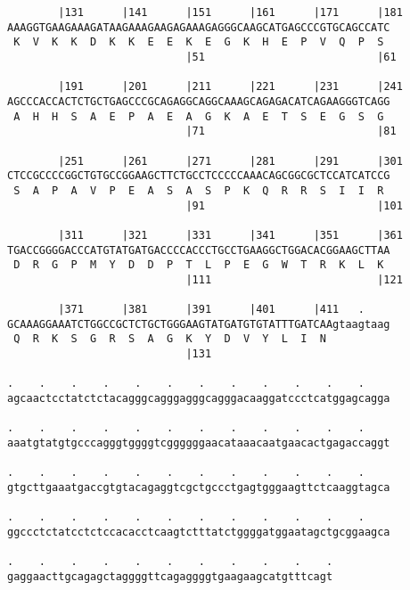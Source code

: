\documentclass{article}
\begin{document}
\begin{Verbatim}
        |131      |141      |151      |161      |171      |181
AAAGGTGAAGAAAGATAAGAAAGAAGAGAAAGAGGGCAAGCATGAGCCCGTGCAGCCATC
 K  V  K  K  D  K  K  E  E  K  E  G  K  H  E  P  V  Q  P  S 
                            |51                           |61
  
        |191      |201      |211      |221      |231      |241
AGCCCACCACTCTGCTGAGCCCGCAGAGGCAGGCAAAGCAGAGACATCAGAAGGGTCAGG
 A  H  H  S  A  E  P  A  E  A  G  K  A  E  T  S  E  G  S  G 
                            |71                           |81
  
        |251      |261      |271      |281      |291      |301
CTCCGCCCCGGCTGTGCCGGAAGCTTCTGCCTCCCCCAAACAGCGGCGCTCCATCATCCG
 S  A  P  A  V  P  E  A  S  A  S  P  K  Q  R  R  S  I  I  R 
                            |91                           |101
  
        |311      |321      |331      |341      |351      |361
TGACCGGGGACCCATGTATGATGACCCCACCCTGCCTGAAGGCTGGACACGGAAGCTTAA
 D  R  G  P  M  Y  D  D  P  T  L  P  E  G  W  T  R  K  L  K 
                            |111                          |121
  
        |371      |381      |391      |401      |411   .    
GCAAAGGAAATCTGGCCGCTCTGCTGGGAAGTATGATGTGTATTTGATCAAgtaagtaag
 Q  R  K  S  G  R  S  A  G  K  Y  D  V  Y  L  I  N          
                            |131                            
  
.    .    .    .    .    .    .    .    .    .    .    .    
agcaactcctatctctacagggcagggagggcagggacaaggatccctcatggagcagga
                                                            
.    .    .    .    .    .    .    .    .    .    .    .    
aaatgtatgtgcccagggtggggtcggggggaacataaacaatgaacactgagaccaggt
                                                            
.    .    .    .    .    .    .    .    .    .    .    .    
gtgcttgaaatgaccgtgtacagaggtcgctgccctgagtgggaagttctcaaggtagca
                                                            
.    .    .    .    .    .    .    .    .    .    .    .    
ggccctctatcctctccacacctcaagtctttatctggggatggaatagctgcggaagca
                                                            
.    .    .    .    .    .    .    .    .    .    .
gaggaacttgcagagctaggggttcagaggggtgaagaagcatgtttcagt
                                                   
                                                   
 

\end{Verbatim}
\end{document}
